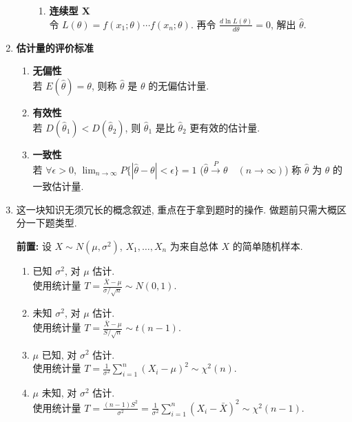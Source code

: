 \documentclass[padp]{ExBook}
\begin{document}
\begin{enumerate}
\begin{enumerate}
\begin{enumerate}[label=\roman*.]
            \item \textbf{连续型 X} \\
            令 $L(\theta) = f(x_1; \theta) \cdots f(x_n; \theta)$.
            再令 $\frac{d \ln L(\theta)}{d\theta} = 0$, 解出 $\hat{\theta}$.
        \end{enumerate}
    
    \end{enumerate}

    \item \textbf{估计量的评价标准}
    \begin{enumerate}
        \item \textbf{无偏性} \\
        若 $E(\hat{\theta}) = \theta$, 则称 $\hat{\theta}$ 是 $\theta$ 的无偏估计量.
        
        \item \textbf{有效性}  \\
        若 $D(\hat{\theta}_1) < D(\hat{\theta}_2)$,
        则 $\hat{\theta}_1$ 是比 $\hat{\theta}_2$ 更有效的估计量.
        
        \item \textbf{一致性}  \\
        若 $\forall \epsilon > 0$,
        $\lim_{n \to \infty} P\{|\hat{\theta} - \theta| < \epsilon\} = 1$ \quad ($\hat{\theta} \xrightarrow{P} \theta \quad (n \to \infty)$)
        称 $\hat{\theta}$ 为 $\theta$ 的一致估计量.
    \end{enumerate}

    \item 
    
    这一块知识无须冗长的概念叙述, 重点在于拿到题时的操作.
    做题前只需大概区分一下题类型.

    \textbf{前置:} 设 $X \sim N(\mu, \sigma^2)$, $X_1, \dots, X_n$ 为来自总体 $X$ 的简单随机样本.

    \begin{enumerate}
        \item 已知 $\sigma^2$, 对 $\mu$ 估计. \\
        使用统计量 $T = \frac{\bar{X} - \mu}{\sigma/\sqrt{n}} \sim N(0,1)$.
        
        \item 未知 $\sigma^2$, 对 $\mu$ 估计. \\
        使用统计量 $T = \frac{\bar{X} - \mu}{S/\sqrt{n}} \sim t(n-1)$.
        
        \item $\mu$ 已知, 对 $\sigma^2$ 估计. \\
        使用统计量 $T = \frac{1}{\sigma^2}\sum_{i=1}^{n}(X_i - \mu)^2 \sim \chi^2(n)$.
        
        \item $\mu$ 未知, 对 $\sigma^2$ 估计. \\
        使用统计量 $T = \frac{(n-1)S^2}{\sigma^2} = \frac{1}{\sigma^2}\sum_{i=1}^{n}(X_i - \bar{X})^2 \sim \chi^2(n-1)$.
    \end{enumerate}
\end{enumerate}
\end{document}
